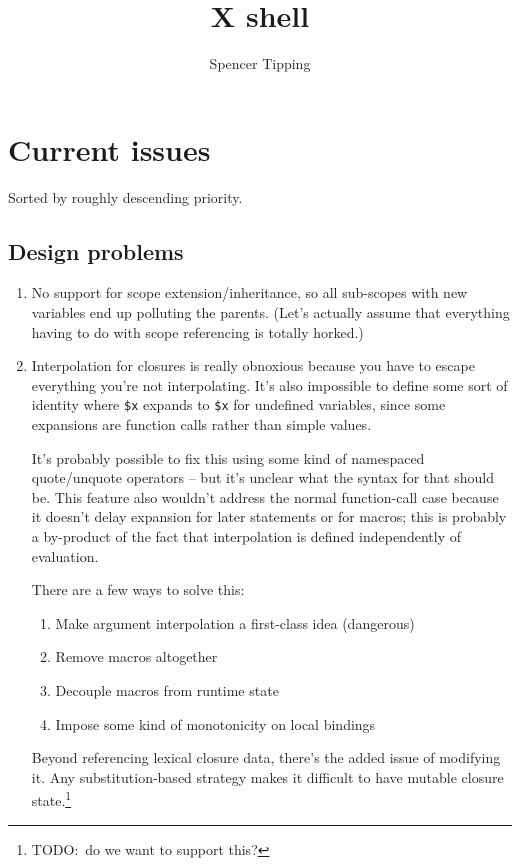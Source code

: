 \documentclass{report}
\title{X shell}
\author{Spencer Tipping}
\begin{document}
\maketitle{}
\tableofcontents{}


\chapter{Current issues}\label{chp:current-issues}
  Sorted by roughly descending priority.

\section{Design problems}\label{sec:design-problems}
\begin{enumerate}
\item{}
  \label{item:no-scope-extension}
  No support for scope extension/inheritance, so all sub-scopes with new
  variables end up polluting the parents. (Let's actually assume that
  everything having to do with scope referencing is totally horked.)

\item{}
  \label{item:obnoxious-closures}
  Interpolation for closures is really obnoxious because you have to
  escape everything you're not interpolating. It's also impossible to
  define some sort of identity where \verb|$x| expands to \verb|$x| for
  undefined variables, since some expansions are function calls rather
  than simple values.

  It's probably possible to fix this using some kind of namespaced
  quote/unquote operators -- but it's unclear what the syntax for that
  should be. This feature also wouldn't address the normal function-call
  case because it doesn't delay expansion for later statements or for
  macros; this is probably a by-product of the fact that interpolation is
  defined independently of evaluation.

  There are a few ways to solve this:

\begin{enumerate}
\item{Make argument interpolation a first-class idea (dangerous)}
\item{Remove macros altogether}
\item{Decouple macros from runtime state}
\item{Impose some kind of monotonicity on local bindings}
\end{enumerate}

  Beyond referencing lexical closure data, there's the added issue of
  modifying it. Any substitution-based strategy makes it difficult to
  have mutable closure state.\footnote{TODO:~do we want to support this?}


\end{enumerate}
\end{document}
